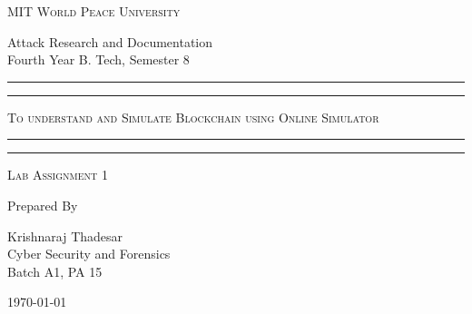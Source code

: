 \documentclass[11pt]{article}
\begin{document}
\begin{titlepage}
	\centering


	\huge\textsc{
		MIT World Peace University
	}\\

	\vspace{0.75\baselineskip} %

	\LARGE{
		Attack Research and Documentation\\
		Fourth Year B. Tech, Semester 8
	}

	\vfill %


	\rule{\textwidth}{1.6pt}\vspace*{-\baselineskip}\vspace*{2pt}
	\rule{\textwidth}{0.6pt}
	\vspace{0.75\baselineskip} %

	\huge{\textsc{
        To understand and Simulate Blockchain using Online Simulator
        }} \\

	\vspace{0.5\baselineskip} %
	\rule{\textwidth}{0.6pt}\vspace*{-\baselineskip}\vspace*{2.8pt}
	\rule{\textwidth}{1.6pt}

	\vspace{1\baselineskip} %


	\LARGE\textsc{
		Lab Assignment 1
	} %
	\vfill


	Prepared By \vspace{0.5\baselineskip} %

	\Large{
		Krishnaraj Thadesar \\
		Cyber Security and Forensics\\
        Batch A1, PA 15
	}

	\vspace{0.5\baselineskip} %
	\today

\end{titlepage}
\end{document}
